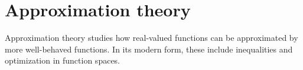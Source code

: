 \chapter{Approximation theory}\label{ch:approximation_theory}

Approximation theory studies how real-valued functions can be approximated by more well-behaved functions. In its modern form, these include inequalities and optimization in function spaces.
